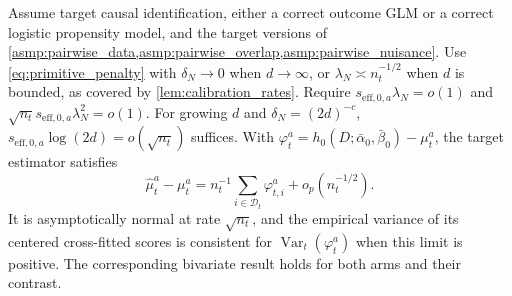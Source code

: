 \documentclass[12pt]{article}
\begin{document}
\begin{proposition}\label{prop:target_only_asymptotic_linearity}
Assume target causal identification, either a correct outcome GLM or a correct logistic propensity model, and the target versions of \cref{asmp:pairwise_data,asmp:pairwise_overlap,asmp:pairwise_nuisance}. Use \cref{eq:primitive_penalty} with $\delta_N\to0$ when $d\to\infty$, or $\lambda_N\asymp n_t^{-1/2}$ when $d$ is bounded, as covered by \cref{lem:calibration_rates}. Require $s_{\mathrm{eff},0,a}\lambda_N=o(1)$ and $\sqrt{n_t}s_{\mathrm{eff},0,a}\lambda_N^2=o(1)$. For growing $d$ and $\delta_N=(2d)^{-c}$, $s_{\mathrm{eff},0,a}\log(2d)=o(\sqrt{n_t})$ suffices. With $\varphi_t^a=h_0(D;\bar\alpha_0,\bar\beta_0)-\mu_t^a$, the target estimator satisfies
\[
\widehat\mu_t^a-\mu_t^a
=n_t^{-1}\sum_{i\in\mathcal D_t}\varphi_{t,i}^a+o_p(n_t^{-1/2}).
\]
It is asymptotically normal at rate $\sqrt{n_t}$, and the empirical variance of its centered cross-fitted scores is consistent for $\operatorname{Var}_t(\varphi_t^a)$ when this limit is positive. The corresponding bivariate result holds for both arms and their contrast.
\end{proposition}
\end{document}
